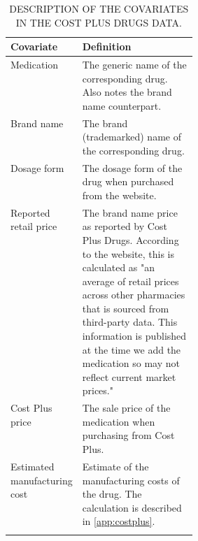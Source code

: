 \documentclass[12pt]{article}
\begin{document}




\begin{table}
\centering
\caption{\MakeUppercase{Description of the covariates in the Cost Plus Drugs data.}}
\label{table:table9}
\begin{singlespace}
\begin{minipage}{0.95\linewidth}
\small
\begin{tabularx}{\linewidth}{@{}>{\raggedright\arraybackslash}p{0.31\linewidth}X@{}}

\toprule
Covariate & Definition \tabularnewline
\midrule

Medication & The generic name of the corresponding drug. Also notes the brand name counterpart. \tabularnewline \addlinespace[3pt]

Brand name & The brand (trademarked) name of the corresponding drug. \tabularnewline \addlinespace[3pt]

Dosage form & The dosage form of the drug when purchased from the website. \tabularnewline \addlinespace[3pt]

Reported retail price & The brand name price as reported by Cost Plus Drugs. According to the website, this is calculated as "an average of retail prices across other pharmacies that is sourced from third-party data. This information is published at the time we add the medication so may not reflect current market prices." \tabularnewline \addlinespace[3pt]

Cost Plus price & The sale price of the medication when purchasing from Cost Plus. \tabularnewline \addlinespace[3pt]

Estimated manufacturing cost & Estimate of the manufacturing costs of the drug. The calculation is described in \autoref{app:costplus}. \tabularnewline \addlinespace[3pt]

\bottomrule
\end{tabularx}
\end{minipage}
\end{singlespace}
\end{table}


\end{document}
